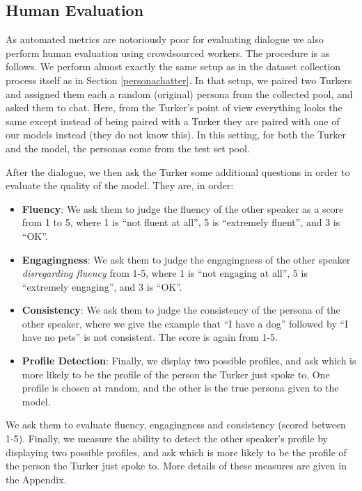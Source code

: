 \documentclass[11pt,a4paper]{article}
\begin{document}
\subsection{Human Evaluation} \label{sec:human-eval}

As automated metrics are notoriously poor for evaluating dialogue \citep{liu2016not} we also perform human evaluation using crowdsourced workers.
The procedure is as follows. We perform almost exactly the same setup as in the dataset collection process itself as in Section \ref{personachatter}. In that setup,  we paired two Turkers and assigned them each a random (original) persona from the collected pool, and asked them to chat. Here, from the Turker's point of view everything looks the same except instead of being paired with a Turker they are paired with one of our models instead (they do not know this). In this setting, for both the Turker and the model, the personas come from the test set pool.

After the dialogue, we then ask the Turker some additional questions in order to evaluate the quality of the model. 
\ifarxiv
They are, in order:
\begin{itemize}

\item {\bf Fluency}: We ask them to judge the fluency of the other speaker as a score from 1 to 5, where 1 is ``not fluent at all'', 5 is ``extremely fluent'', and 3 is ``OK''. 

\item {\bf Engagingness}: We ask them to judge the engagingness of the other speaker {\em disregarding fluency} from 1-5, where 1 is ``not engaging at all'', 5 is ``extremely engaging'', and 3 is ``OK''.

\item {\bf Consistency}: We ask them to judge the consistency of the persona of the other speaker, where we give the example that ``I have a dog''  followed by ``I have no pets'' is not consistent. The score is again from 1-5.

\item {\bf Profile Detection}: Finally, we display two possible profiles, and ask which is more likely to be the profile of the person the Turker just spoke to. One profile is chosen at random, and the other is the true persona given to the model.
\end{itemize}
\else
We ask them to evaluate fluency, engagingness and consistency (scored between 1-5). Finally, we measure the ability to detect the other speaker's profile by displaying two possible profiles, and ask which is more likely to be the profile of the person the Turker just spoke to.  More details of these measures are given in the Appendix.
\fi
\end{document}

